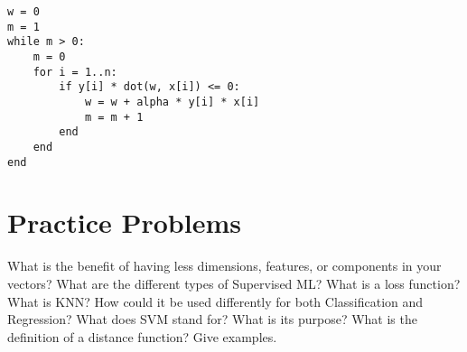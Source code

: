 \begin{verbatim}
w = 0
m = 1
while m > 0:
    m = 0
    for i = 1..n:
        if y[i] * dot(w, x[i]) <= 0:
            w = w + alpha * y[i] * x[i]
            m = m + 1
        end
    end
end
\end{verbatim}

\section{Practice Problems}

\begin{outline}[enumerate]
    \1 What is the benefit of having less dimensions, features, or components in your vectors?
    \1 What are the different types of Supervised ML?
    \1 What is a loss function?
    \1 What is KNN? How could it be used differently for both Classification and Regression?
    \1 What does SVM stand for? What is its purpose?
    \1 What is the definition of a distance function? Give examples.
\end{outline}